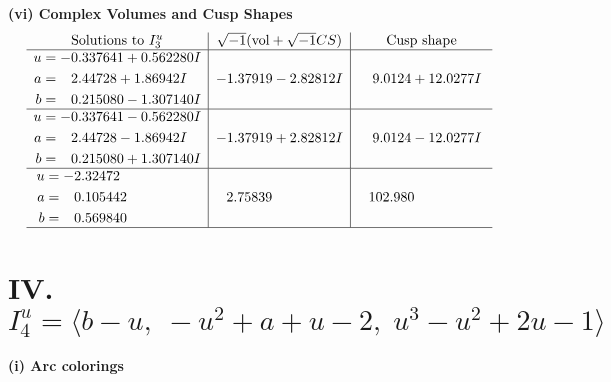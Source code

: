 \documentclass[1p]{elsarticle_modified}
\theoremstyle{definition}
\newcommand{\I}{\sqrt{-1}}
\begin{document}
\newpage\flushleft \textbf{(vi) Complex Volumes and Cusp Shapes}
$$\begin{array}{c|c|c}  
\text{Solutions to }I^u_{3}& \I (\text{vol} + \sqrt{-1}CS) & \text{Cusp shape}\\
 \hline 
\begin{aligned}
u &= -0.337641 + 0.562280 I \\
a &= \phantom{-}2.44728 + 1.86942 I \\
b &= \phantom{-}0.215080 - 1.307140 I\end{aligned}
 & -1.37919 - 2.82812 I & \phantom{-}9.0124 + 12.0277 I \\ \hline\begin{aligned}
u &= -0.337641 - 0.562280 I \\
a &= \phantom{-}2.44728 - 1.86942 I \\
b &= \phantom{-}0.215080 + 1.307140 I\end{aligned}
 & -1.37919 + 2.82812 I & \phantom{-}9.0124 - 12.0277 I \\ \hline\begin{aligned}
u &= -2.32472\phantom{ +0.000000I} \\
a &= \phantom{-}0.105442\phantom{ +0.000000I} \\
b &= \phantom{-}0.569840\phantom{ +0.000000I}\end{aligned}
 & \phantom{-}2.75839\phantom{ +0.000000I} & \phantom{-}102.980\phantom{ +0.000000I}\\
 \hline 
 \end{array}$$\newpage\newpage\renewcommand{\arraystretch}{1}
\centering \section*{IV. $I^u_{4}= \langle b- u,\;- u^2+a+u-2,\;u^3- u^2+2 u-1 \rangle$}
\flushleft \textbf{(i) Arc colorings}\\
\end{document}
